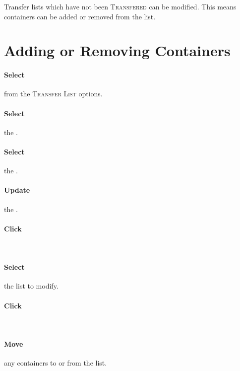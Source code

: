 Transfer lists which have not been \textsc{Transfered} can be modified. This means containers can be added or removed from the list.


\section{Adding or Removing Containers}

\paragraph{Select}  from the \textsc{Transfer List} options.\\


\paragraph{Select} the .

\paragraph{Select} the .

\paragraph{Update} the .

\paragraph{Click} \\


\paragraph{Select} the list to modify.

\paragraph{Click} \\


\paragraph{Move} any containers to or from the list.

